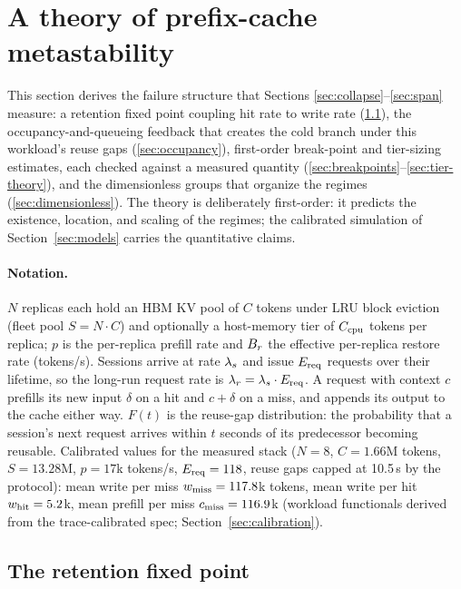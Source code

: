 \section{A theory of prefix-cache metastability}
\label{sec:theory}

This section derives the failure structure that Sections \ref{sec:collapse}--\ref{sec:span}
measure: a retention fixed point coupling hit rate to write rate
(\ref{sec:retention}), the occupancy-and-queueing feedback that creates the cold
branch under this workload's reuse gaps (\ref{sec:occupancy}), first-order
break-point and tier-sizing estimates, each checked against a
measured quantity (\ref{sec:breakpoints}--\ref{sec:tier-theory}), and the dimensionless groups that
organize the regimes (\ref{sec:dimensionless}). The theory is deliberately first-order:
it predicts the existence, location, and scaling of the regimes; the
calibrated simulation of Section~\ref{sec:models} carries the quantitative claims.

\paragraph{Notation.} $N$ replicas each hold an HBM KV pool of $C$ tokens under LRU
block eviction (fleet pool $S = N \cdot C$) and optionally a host-memory
tier of $C_{\mathrm{cpu}}$ tokens per replica; $p$ is the per-replica prefill rate
and $B_r$ the effective per-replica restore rate (tokens/s). Sessions
arrive at rate $\lambda_s$ and issue $E_{\mathrm{req}}$ requests over their
lifetime, so the long-run request rate is $\lambda_r = \lambda_s \cdot E_{\mathrm{req}}$.
A request with context $c$ prefills its new input $\delta$ on a
hit and $c + \delta$ on a miss, and appends its output to the cache
either way. $F(t)$ is the reuse-gap distribution: the probability that
a session's next request arrives within $t$ seconds of its predecessor
becoming reusable. Calibrated values for the measured stack ($N = 8$,
$C = 1.66$M tokens, $S = 13.28$M, $p = 17$k tokens/s, $E_{\mathrm{req}} = 118$, reuse
gaps capped at 10.5\,s by the protocol): mean write per miss
$w_{\mathrm{miss}} = 117.8$k tokens, mean write per hit $w_{\mathrm{hit}} = 5.2$k, mean
prefill per miss $c_{\mathrm{miss}} = 116.9$k (workload functionals derived from
the trace-calibrated spec; Section~\ref{sec:calibration}).

\subsection{The retention fixed point}
\label{sec:retention}

